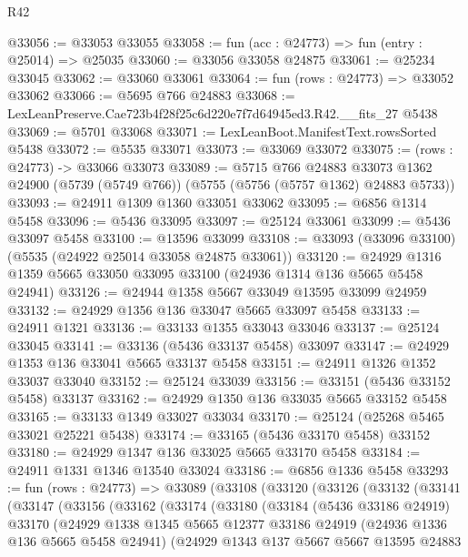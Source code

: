\begin{lexlean}{R42}
\begin{coremodule}
@33056 := @33053 @33055
@33058 := fun (acc : @24773) => fun (entry : @25014) => @25035
@33060 := @33056 @33058 @24875
@33061 := @25234 @33045
@33062 := @33060 @33061
@33064 := fun (rows : @24773) => @33052 @33062
@33066 := @5695 @766 @24883
@33068 := LexLeanPreserve.Cae723b4f28f25c6d220e7f7d64945ed3.R42.__fits_27 @5438
@33069 := @5701 @33068
@33071 := LexLeanBoot.ManifestText.rowsSorted @5438
@33072 := @5535 @33071
@33073 := @33069 @33072
@33075 := (rows : @24773) -> @33066 @33073
@33089 := @5715
    @766
    @24883
    @33073
    @1362
    @24900
    (@5739 (@5749 @766))
    (@5755 (@5756 (@5757 @1362) @24883 @5733))
@33093 := @24911 @1309 @1360 @33051 @33062
@33095 := @6856 @1314 @5458
@33096 := @5436 @33095
@33097 := @25124 @33061
@33099 := @5436 @33097 @5458
@33100 := @13596 @33099
@33108 := @33093 (@33096 @33100) (@5535 (@24922 @25014 @33058 @24875 @33061))
@33120 := @24929 @1316 @1359 @5665 @33050 @33095 @33100 (@24936 @1314 @136 @5665 @5458 @24941)
@33126 := @24944 @1358 @5667 @33049 @13595 @33099 @24959
@33132 := @24929 @1356 @136 @33047 @5665 @33097 @5458
@33133 := @24911 @1321
@33136 := @33133 @1355 @33043 @33046
@33137 := @25124 @33045
@33141 := @33136 (@5436 @33137 @5458) @33097
@33147 := @24929 @1353 @136 @33041 @5665 @33137 @5458
@33151 := @24911 @1326 @1352 @33037 @33040
@33152 := @25124 @33039
@33156 := @33151 (@5436 @33152 @5458) @33137
@33162 := @24929 @1350 @136 @33035 @5665 @33152 @5458
@33165 := @33133 @1349 @33027 @33034
@33170 := @25124 (@25268 @5465 @33021 @25221 @5438)
@33174 := @33165 (@5436 @33170 @5458) @33152
@33180 := @24929 @1347 @136 @33025 @5665 @33170 @5458
@33184 := @24911 @1331 @1346 @13540 @33024
@33186 := @6856 @1336 @5458
@33293 := fun (rows : @24773) =>
  @33089
    (@33108
      (@33120
        (@33126
          (@33132
            (@33141
              (@33147
                (@33156
                  (@33162
                    (@33174
                      (@33180
                        (@33184
                          (@5436 @33186 @24919)
                          @33170
                          (@24929
                            @1338
                            @1345
                            @5665
                            @12377
                            @33186
                            @24919
                            (@24936 @1336 @136 @5665 @5458 @24941)
                            (@24929
                              @1343
                              @137
                              @5667
                              @5667
                              @13595
                              @24883

\end{coremodule}
\end{lexlean}
